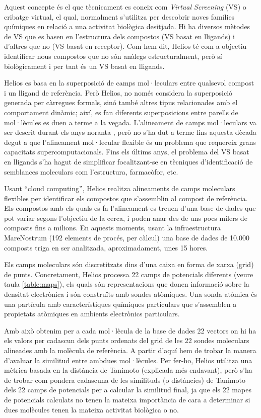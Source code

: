 Aquest concepte és el que tècnicament es coneix com \emph{Virtual Screening} (VS) o cribatge virtual,
el qual, normalment s'utilitza per descobrir noves famílies químiques en relació a una activitat biològica
desitjada. Hi ha diversos mètodes de VS que es basen en l'estructura dels compostos (VS basat en lligands) i d'altres que no
(VS basat en receptor). Com hem dit, Helios té com a objectiu identificar nous compostos que no són anàlegs estructuralment,
però sí biològicament i per tant és un VS basat en lligands.

Helios es basa en la superposició de camps mol·leculars entre qualsevol compost i un lligand de
referència. Però Helios, no només considera la superposició generada per càrregues formals, sinó
també altres tipus relacionades amb el comportament dinàmic; així, es fan diferents superposicions
entre parells de mol·lècules es duen a terme a la vegada. L'alineament de camps mol·leculars va ser
descrit durant els anys noranta \cite{WHW04},
però no s'ha dut a terme fins aquesta dècada degut a que l'alineament mol·lecular flexible és un problema que requereix
grans capacitats supercomputacionals. Fins els últims anys, el problema del VS basat en lligands s'ha hagut de simplificar
focalitzant-se en tècniques d'identificació de semblances moleculars com l'estructura, farmacòfor, etc. 

Usant ``cloud computing'', Helios realitza alineaments de camps moleculars flexibles per identificar els compostos que s'assemblin
al compost de referència. Els compostos amb els quals es fa l'alineament es treuen d'una base de dades que pot variar segons l'objectiu de la cerca, i
poden anar des de uns pocs milers de composts fins a milions. En aquests moments, usant la infraestructura MareNostrum (192 elements de procés, per càlcul)
una base de dades de 10.000 composts triga en ser analitzada, aproximadament, unes 15 hores.

Els camps moleculars són discretitzats dins d'una caixa en forma de xarxa (grid) de punts. Concretament, Helios processa 22 camps de potencials diferents (veure taula \ref{table:maps}), els quals són representacions que donen informació sobre la densitat electrònica i són construïts amb sondes atòmiques. Una sonda atòmica és una partícula amb
característiques químiques particulars que s'assemblen a propietats atòmiques en ambients electrònics particulars. 

Amb això obtenim per a cada mol·lècula de la base de dades 22 vectors on hi ha els valors per cadascun dels punts ordenats del grid de les 22 sondes moleculars
alineades amb la molècula de referència. A partir d'aquí hem de trobar la manera d'avaluar la similitud entre ambdues mol·lècules. Per fer-ho, Helios utilitza una mètrica
basada en la distància de Tanimoto (explicada més endavant), però s'ha de trobar com pondera cadascuna de les similituds (o distàncies) de Tanimoto dels 22 camps de
potencials per a calcular la similitud final, ja que els 22 mapes de potencials calculats no tenen la mateixa importància de cara a determinar si dues molècules tenen
la mateixa activitat biològica o no.

